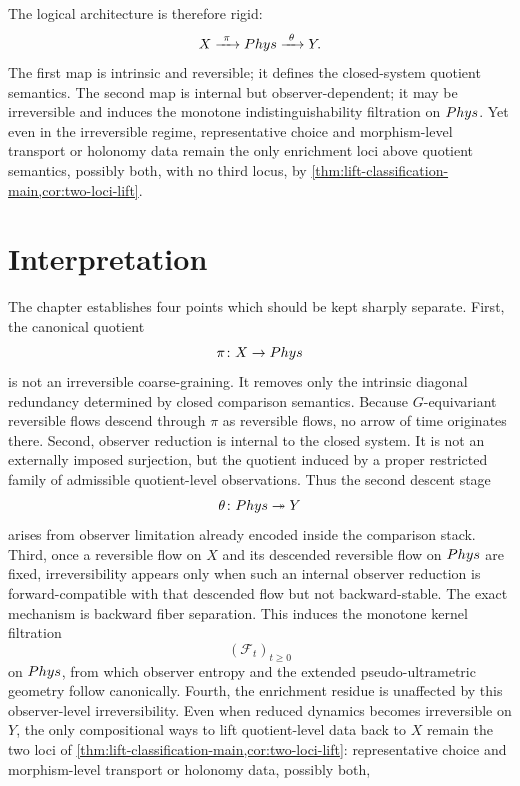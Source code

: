 \begin{remark}
	The logical architecture is therefore rigid:
	\[
		X
		\xrightarrow{\ \pi\ }
		Phys
		\xrightarrow{\ \theta\ }
		Y.
	\]
	The first map is intrinsic and reversible; it defines the closed-system
	quotient semantics. The second map is internal but observer-dependent;
	it may be irreversible and induces the monotone indistinguishability
	filtration on \(Phys\). Yet even in the irreversible regime,
	representative choice and morphism-level transport or holonomy data
	remain the only enrichment loci above quotient semantics, possibly both,
	with no third locus, by
	\cref{thm:lift-classification-main,cor:two-loci-lift}.
\end{remark}
\section{Interpretation}
The chapter establishes four points which should be kept sharply
separate.
First, the canonical quotient
\[
	\pi\colon X\to Phys
\]
is not an irreversible coarse-graining. It removes only the intrinsic
diagonal redundancy determined by closed comparison semantics. Because
\(G\)-equivariant reversible flows descend through \(\pi\) as
reversible flows, no arrow of time originates there.
Second, observer reduction is internal to the closed system. It is not
an externally imposed surjection, but the quotient induced by a proper
restricted family of admissible quotient-level observations. Thus the
second descent stage
\[
	\theta\colon Phys\twoheadrightarrow Y
\]
arises from observer limitation already encoded inside the comparison
stack.
Third, once a reversible flow on \(X\) and its descended reversible
flow on \(Phys\) are fixed, irreversibility appears only when such an
internal observer reduction is forward-compatible with that descended
flow but not backward-stable. The exact mechanism is backward fiber
separation. This induces the monotone kernel
filtration
\[
	(\mathcal F_t)_{t\ge0}
\]
on \(Phys\), from which observer entropy and the extended
pseudo-ultrametric geometry follow canonically.
Fourth, the enrichment residue is unaffected by this observer-level
irreversibility. Even when reduced dynamics becomes irreversible on
\(Y\), the only compositional ways to lift quotient-level data back to
\(X\) remain the two loci of
\cref{thm:lift-classification-main,cor:two-loci-lift}: representative
choice and morphism-level transport or holonomy data, possibly both,
